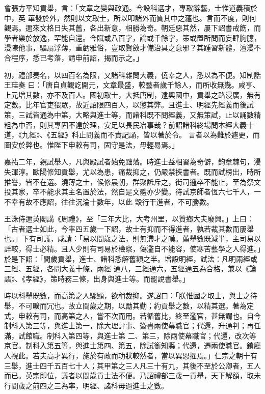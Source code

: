 \begin{pinyinscope}
 會張方平知貢舉，言：「文章之變與政通。今設科選才，專取辭藝，士惟道義積於中，英
 華發於外，然則以文取士，所以叩諸外而質其中之蘊也。言而不度，則何觀焉。邇來文格日失其舊，各出新意，相勝為奇。朝廷惡其然，屢下詔書戒飭，而學者樂於放逸，罕能自還。今賦或八百字，論或千餘字，策或置所問而妄肆胸臆，漫陳他事，驅扇浮薄，重虧雅俗，豈取賢斂才備治具之意邪？其踵習新體，澶漫不合程序，悉已考落，請申前詔，揭而示之。」



 初，禮部奏名，以四百名為限，又諸科雜問大義，僥幸之人，悉以為不便。知制誥王珪奏
 曰：「唐自貞觀訖開元，文章最盛，較藝者歲千餘人，而所收無幾。咸亨、上元增其數，亦不及百人。國初取士，大抵唐制，逮興國中，貢舉之路浸廣，無有定數。比年官吏猥眾，故近詔限四百人，以懲其弊。且進士、明經先經義而後試策，三試皆通為中第，大略與進士等，而諸科既不問經義，又無策試，止以誦數精粗為中否，則其專固不達於理，安足以長民冶事哉？前詔諸科終場問本經大義十道，《九經》、《五經》科止問義而不責記誦，皆以著於令。
 言者以為難於遽更，而圖安於弊也。惟陛下申敕有司，固守是法，毋輕易焉。」



 嘉祐二年，親試舉人，凡與殿試者始免黜落。時進士益相習為奇僻，鉤章棘句，浸失渾淳。歐陽修知貢舉，尤以為患，痛裁抑之，仍嚴禁挾書者。既而試榜出，時所推譽，皆不在選。澆薄之士，候修晨朝，群聚詆斥之，街司邏卒不能止，至為祭文投其家，卒不能求其主名置於法，然自是文體亦少變。待試京師者恆六七千人，一不幸有故不應詔，往往沉淪十數年，以此
 毀行干進者，不可勝數。



 王洙侍邇英閣講《周禮》，至「三年大比，大考州里，以贊鄉大夫廢興。」上曰：「古者選士如此，今率四五歲一下詔，故士有抑而不得進者，孰若裁其數而屢舉也。」下有司議，咸請：「易以間歲之法，則無滯才之嘆。薦舉數既減半，主司易以詳較，得士必精。且人少則有司易於檢察，偽濫自不能容，使寒苦藝學之人得進。」於是下詔：「間歲貢舉，進士、諸科悉解舊額之半。增設明經，試法：凡明兩經或三經、五經，各問大義十條，兩經
 通八，三經通六，五經通五為合格，兼以《論語》、《孝經》，策時務三條，出身與進士等。而罷說書舉。」



 時以科舉既數，而高第之人驟顯，欲稍裁抑。遂詔曰：「朕惟國之取士，與士之待舉，不可曠而冗也。故立間歲之期，以勵其勤；約貢舉之數，以精其選。著為定式，申敕有司，而高第之人，嘗不次而用。若循舊比，終至濫官，甚無謂也。自今制科入第三等，與進士第一，除大理評事、簽書兩使幕職官；代還，升通判；再任滿，試館職。制科入第四等，與進士第
 二、第三，除兩使幕職官；代還，改次等京官。制科入第五等，與進士第四、第五，除試銜知縣；代還，遷兩使職官。鎖廳人視此。若夫高才異行，施於有政而功狀較然者，當以異恩擢焉。」仁宗之朝十有三舉，進士四千五百七十人；其甲第之三人凡三十有九，其後不至於公卿者，五人而已。英宗即位，議者以間歲貢士法不便。乃詔禮部三歲一貢舉，天下解額，取未行間歲之前四之三為率，明經、諸科毋過進士之數。




\end{pinyinscope}
